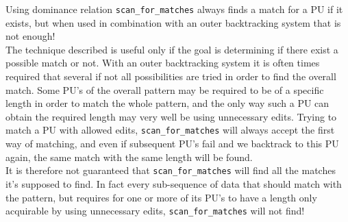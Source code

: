 \documentclass[12pt]{article}
\newcommand{\scm}{\texttt{scan\_for\_matches} }
\newcommand{\pu}{PU }
\newcommand{\pus}{PU's }
\begin{document}
\noindent Using dominance relation \scm always finds a match for a \pu if it exists, but when used in combination
with an outer backtracking system that is not enough! \\
The technique described is useful only if the goal is determining if there exist a possible match or not.
With an outer backtracking system it is often times required that several if not all possibilities are tried in
order to find the overall match. Some \pus of the overall pattern may be required to be of a specific length in order to
match the whole pattern, and the only way such a \pu can obtain the required length may very well be using unnecessary
edits. Trying to match a \pu with allowed edits, \scm will always accept the first way of matching, and even if
subsequent \pus fail and we backtrack to this \pu again, the same match with the same length will be found. \\
It is therefore not guaranteed that \scm will find all the matches it's supposed to find. In fact every sub-sequence
of data that should match with the pattern, but requires for one or more of its \pus to have a length only
acquirable by using unnecessary edits, \scm will not find!
\end{document}
